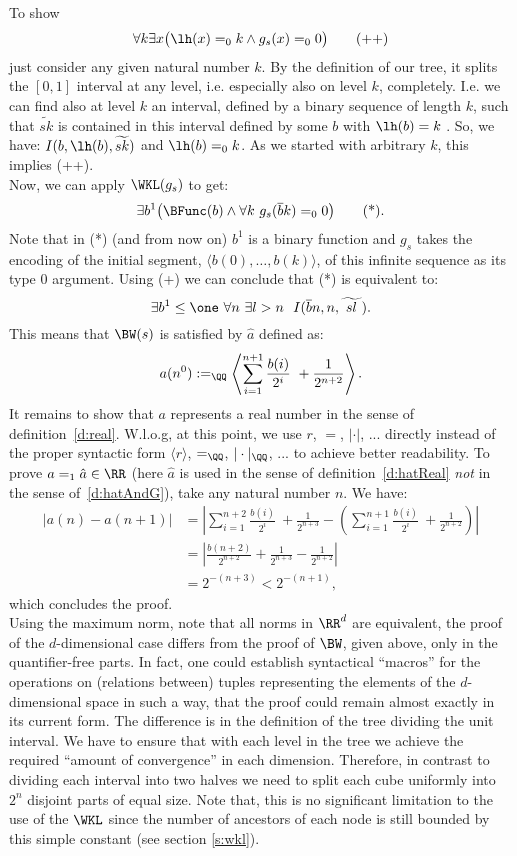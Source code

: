 To show 
\[
\forall k\exists x \big(\lh(x)=_0k \wedge g_s(x)=_00\big) \tag{++}
\]
just consider any given 
natural number $k$. By the definition of our tree, it splits the $[0,1]$ 
interval at any level, i.e. especially also on level $k$, completely. 
I.e. we can find also at level $k$ an interval, defined by a binary 
sequence of length $k$, such that $\widetilde{ sk }$ is contained in this
interval defined by some $b$ with $\lh(b)=k$  . 
So, we have: $I( b, \lh(b), \widetilde{ sk })$ and $ \lh(b)=_0k$. 
As we started with arbitrary $k$, this implies (++).\\
Now, we can apply $\WKL(g_s)$ to get:
\[
\exists b^1 \big(\BFunc(b) \wedge \forall k\ g_s(\overline{b}k)=_00\big) 
\tag{*}
\text{.}
\]
Note that in (*) (and from now on) $b^1$ is 
a binary function and $g_s$ takes
the encoding of the initial segment, $\langle b(0),\ldots,b(k)\rangle$, 
of this infinite sequence as its type $0$ argument.
Using (+) we can conclude that (*) is equivalent to:
\[
\exists b^1\leq\one\ \forall n\ \exists l>n\ \ I(\overline{b}n,n,\widetilde{\ sl\ })
\text{.}\]
This means that $\BW(s)$ is satisfied by $\hat a$ defined as:
\[
a(n^0):=_\QQ \left\langle \sum_{i=1}^{n+1} \frac{b(i)}{2^i}\ +
               \frac{1}{2^{n+2}}\right\rangle
\text{.}
\]
%
It remains to show that $a$ represents a real 
number in the sense of definition~\ref{d:real}.
W.l.o.g, at this point, we use $r$, $=$, $|\cdot|$, ... directly
instead of the proper syntactic form $\langle r\rangle$, $=_\QQ$, $|\cdot|_\QQ$, ...
to achieve better readability.
To prove $a=_1\hat a\in\RR$ (here $\hat a$ is used in the sense
of definition~\ref{d:hatReal} {\em not} in the sense of~\ref{d:hatAndG}), 
take any natural number $n$. We have:
\begin{align*}
|a(n)-a(n+1)|&=
\left|
\sum_{i=1}^{n+2} \frac{b(i)}{2^i}\ +
 \frac{1}{2^{n+3}}
-
\left(\sum_{i=1}^{n+1} \frac{b(i)}{2^i}\ +
 \frac{1}{2^{n+2}}\right)
\right|
\\
&=
\left|
\frac{b(n+2)}{2^{n+2}}+\frac{1}{2^{n+3}}
-
\frac{1}{2^{n+2}}
\right|
\\
&=
2^{-(n+3)} < 2^{-(n+1)}
\text{,}
\end{align*}
which concludes the proof.\\
%
%

Using the maximum norm, note that all norms in $\RR^d$ are equivalent,
the proof of the $d$-dimensional case differs from the proof of $\BW$, given above,
only in the quantifier-free parts. In fact, one could establish
syntactical ``macros'' for the operations on (relations between) 
tuples representing the elements of  the $d$-dimensional space
in such a way, that the proof could remain almost exactly in its current form. 
The difference is in the
definition of the tree dividing the unit interval. We have to ensure that with each level
in the tree we achieve the required ``amount of convergence'' in each dimension. 
Therefore, in contrast to
dividing each interval into two halves we need to split each cube uniformly
into $2^n$ disjoint parts of equal size. Note that,
this is no significant limitation to the use of the $\WKL$ since the number of
ancestors of each node is still bounded by this simple constant (see section \ref{s:wkl}).



